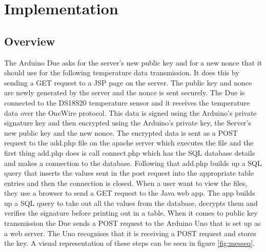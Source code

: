 
\chapter{Implementation}
\label{imple}

\section{Overview}

The Arduino Due asks for the server's new public key and for a new nonce that it should use for the following temperature data transmission. It does this by sending a GET request to a JSP page on the server. The public key and nonce are newly generated by the server and the nonce is sent securely. The Due is connected to the DS18S20 temperature sensor and it receives the temperature data over the OneWire protocol. This data is signed using the Arduino's private signature key and then encrypted using the Arduino's private key, the Server's new public key and the new nonce. The encrypted data is sent as a POST request to the add.php file on the apache server which executes the file and the first thing add.php does is call connect.php which has the SQL database details and makes a connection to the database. Following that add.php builds up a SQL query that inserts the values sent in the post request into the appropriate table entries and then the connection is closed.
When a user want to view the files, they use a browser to send a GET request to the Java web app. The app builds up a SQL query to take out all the values from the database, decrypts them and verifies the signature before printing out in a table.
When it comes to public key transmission the Due sends a POST request to the Arduino Uno that is set up as a web server. The Uno recognises that it is receiving a POST request and stores the key. A visual representation of these steps can be seen in figure \ref{fig:messeq}.




